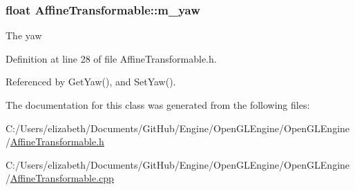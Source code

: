 \subsubsection[{\texorpdfstring{m\+\_\+yaw}{m_yaw}}]{\setlength{\rightskip}{0pt plus 5cm}float Affine\+Transformable\+::m\+\_\+yaw\hspace{0.3cm}{\ttfamily [private]}}\hypertarget{class_affine_transformable_abf9b231dc1bd3e61bbbed8714f127f93}{}\label{class_affine_transformable_abf9b231dc1bd3e61bbbed8714f127f93}


The yaw 



Definition at line 28 of file Affine\+Transformable.\+h.



Referenced by Get\+Yaw(), and Set\+Yaw().



The documentation for this class was generated from the following files\+:\begin{DoxyCompactItemize}
\item 
C\+:/\+Users/elizabeth/\+Documents/\+Git\+Hub/\+Engine/\+Open\+G\+L\+Engine/\+Open\+G\+L\+Engine/\hyperlink{_affine_transformable_8h}{Affine\+Transformable.\+h}\item 
C\+:/\+Users/elizabeth/\+Documents/\+Git\+Hub/\+Engine/\+Open\+G\+L\+Engine/\+Open\+G\+L\+Engine/\hyperlink{_affine_transformable_8cpp}{Affine\+Transformable.\+cpp}\end{DoxyCompactItemize}
